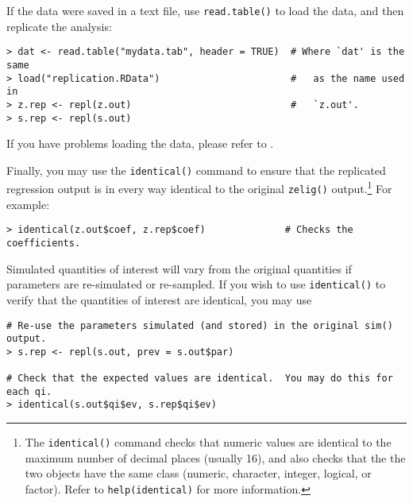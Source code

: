 If the data were saved in a text file, use {\tt read.table()} to load
the data, and then replicate the analysis:
\begin{verbatim}
> dat <- read.table("mydata.tab", header = TRUE)  # Where `dat' is the same
> load("replication.RData")                       #   as the name used in 
> z.rep <- repl(z.out)                            #   `z.out'.
> s.rep <- repl(s.out)  
\end{verbatim}
If you have problems loading the data, please refer to .

Finally, you may use the {\tt identical()} command to ensure that the
replicated regression output is in every way identical to the original
{\tt zelig()} output.\footnote{The {\tt identical()} command checks
  that numeric values are identical to the maximum number of decimal
  places (usually 16), and also checks that the the two objects have
  the same class (numeric, character, integer, logical, or factor).
  Refer to {\tt help(identical)} for more information.}  For example:
\begin{verbatim}
> identical(z.out$coef, z.rep$coef)              # Checks the coefficients.
\end{verbatim}
Simulated quantities of interest will vary from the original
quantities if parameters are re-simulated or re-sampled.  If you wish to
use {\tt identical()} to verify that the quantities of interest are
identical, you may use
\begin{verbatim}
# Re-use the parameters simulated (and stored) in the original sim() output.
> s.rep <- repl(s.out, prev = s.out$par) 

# Check that the expected values are identical.  You may do this for each qi.
> identical(s.out$qi$ev, s.rep$qi$ev) 
\end{verbatim} %


